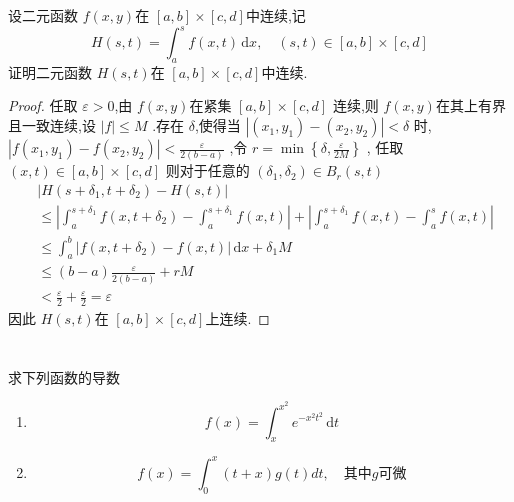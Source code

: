 \documentclass[lang=cn,12pt,color=green,fontset=none,thmcnt=section]{elegantbook}
\begin{document}
\begin{exercise}
    设二元函数 $ f\left( x,y \right)  $在 $ [a,b]\times [c,d] $中连续,记 $$
    H\left( s,t \right) = \int_{a}^{s} f\left( x,t \right) \,\mathrm{d} x, \quad  \left( s,t \right) \in [a,b]\times [c,d]   
    $$证明二元函数 $ H\left( s,t \right)  $在 $ [a,b]\times  [c,d] $中连续.    
\end{exercise}
\begin{proof}
    任取 $ \varepsilon >0 $,由 $ f\left( x,y \right)  $在紧集 $ [a,b]\times  [c,d] $   连续,则 $ f\left( x,y \right)  $在其上有界且一致连续,设 $ \left| f \right| \le  M  $  .存在 $ \delta  $,使得当 $ \left| \left( x_1,y_1 \right)  - \left( x_2,y_2 \right) \right| < \delta   $    时, $ \left| f\left( x_1,y_1 \right)  -f\left( x_2,y_2 \right) \right|< \frac{\varepsilon}{2 \left( b-a \right) }  $ ,令 $ r = \min \left\{  \delta ,  \frac{\varepsilon}{2M} \right\} $ ,
任取 $ \left( x,t \right) \in [a,b]\times  [c,d]  $ 则对于任意的 $ \left( \delta _{1},\delta _{2} \right) \in B_{r}\left( s,t \right)    $ 
    $$
  \begin{aligned}
    &\left|  H\left( s+ \delta _{1},t+ \delta _{2} \right)-H\left( s,t \right)  \right| \\ 
     & \le \left|  \int_{a}^{s+ \delta _{1}}f\left( x,t+ \delta _{2} \right)- \int_{a}^{s+ \delta _{1}} f\left( x,t \right)  \right| +  \left| \int_{a}^{s+ \delta _{1}}f\left( x,t \right)- \int_{a}^{s} f\left( x,t \right)      \right| \\ 
      & \le \int_{a}^{b} \left| f\left( x,t+ \delta _{2} \right)  -f\left( x,t \right)  \right|  \,\mathrm{d} x +  \delta _{1}M \\ 
       & \le \left( b-a \right) \frac{\varepsilon}{2\left( b-a \right) }  +  rM\\ 
       & < \frac{\varepsilon}{2}+  \frac{\varepsilon}{2} = \varepsilon 
  \end{aligned} 
    $$因此 $ H\left( s,t \right)  $在 $ [a,b]\times [c,d] $上连续. 
    
\end{proof}


\chapter{}  

\begin{exercise}
    求下列函数的导数
    \begin{enumerate}
        \item  $$
        f\left( x \right) = \int_{x}^{x^{2}} e^{-x^{2}t^{2}}\,\mathrm{d} t 
        $$
        \item $$
        f\left( x \right)= \int_{0}^{x}\left( t+ x \right)g\left( t \right)dt,\quad \text{其中} g \text{可微}   
        $$
    \end{enumerate}
    
\end{exercise}
\end{document}
